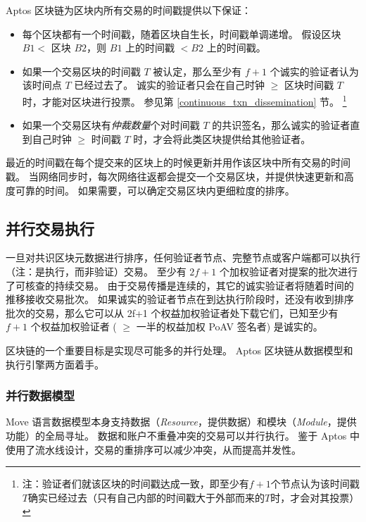 \documentclass{article}
\begin{document}
Aptos 区块链为区块内所有交易的时间戳提供以下保证：

\begin{itemize}
\item 
每个区块都有一个时间戳，随着区块自生长，时间戳单调递增。 假设区块 $B1 < $  区块 $B2$，则 $B1$ 上的时间戳 $< B2$ 上的时间戳。

\item 如果一个交易区块的时间戳 $T$ 被认定，那么至少有 $f+1$ 个诚实的验证者认为该时间点 $T$ 已经过去了。 诚实的验证者只会在自己时钟 $\ge$ 区块时间戳 $T$ 时，才能对区块进行投票。 参见第 \ref{continuous_txn_dissemination} 节。
\footnote{注：验证者们就该区块的时间戳达成一致，即至少有$f+1$个节点认为该时间戳$T$确实已经过去（只有自己内部的时间戳大于外部而来的$T$时，才会对其投票）}

\item 如果一个交易区块有\emph{仲裁数量}个对时间戳 $T$ 的共识签名，那么诚实的验证者直到自己时钟 $\ge$ 时间戳 $T$ 时，才会将此类区块提供给其他验证者。

\end{itemize}

最近的时间戳在每个提交来的区块上的时候更新并用作该区块中所有交易的时间戳。 当网络同步时，每次网络往返都会提交一个交易区块，并提供快速更新和高度可靠的时间。 如果需要，可以确定交易区块内更细粒度的排序。


\subsection{并行交易执行}
\label{subsec:parallel_transaction_execution}
一旦对共识区块元数据进行排序，任何验证者节点、完整节点或客户端都可以执行（注：是执行，而非验证）交易。 至少有 $2f+1$  个加权验证者对提案的批次进行了可核查的持续交易。 由于交易传播是连续的，其它的诚实验证者将随着时间的推移接收交易批次。 如果诚实的验证者节点在到达执行阶段时，还没有收到排序批次的交易，那么它可以从 2f+1 个权益加权验证者处下载它们，已知至少有 $f+1$ 个权益加权验证者 ( $\ge$ 一半的权益加权 PoAV 签名者) 是诚实的。

区块链的一个重要目标是实现尽可能多的并行处理。 Aptos 区块链从数据模型和执行引擎两方面着手。

\subsubsection{并行数据模型}

Move 语言数据模型本身支持数据（\emph{Resource}，提供数据）和模块（\emph{Module}，提供功能）的全局寻址。 数据和账户不重叠冲突的交易可以并行执行。 鉴于 Aptos 中使用了流水线设计，交易的重排序可以减少冲突，从而提高并发性。
\end{document}
